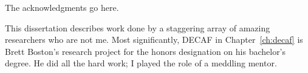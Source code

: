 The acknowledgments go here.

This dissertation describes work done by a staggering array of amazing
researchers who are not me.
Most significantly, DECAF in Chapter~\ref{ch:decaf} is Brett Boston's research
project for the honors designation on his bachelor's degree.
He did all the hard work; I played the role of a meddling mentor.
